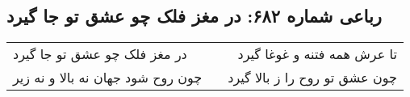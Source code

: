 \begin{center}
\section*{رباعی شماره ۶۸۲: در مغز فلک چو عشق تو جا گیرد}
\label{sec:0682}
\begin{longtable}{l p{0.5cm} r}
در مغز فلک چو عشق تو جا گیرد
&&
تا عرش همه فتنه و غوغا گیرد
\\
چون روح شود جهان نه بالا و نه زیر
&&
چون عشق تو روح را ز بالا گیرد
\\
\end{longtable}
\end{center}
